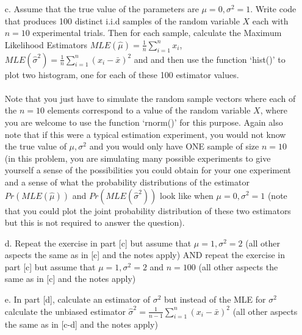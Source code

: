 \documentclass[letterpaper, 11pt]{article}
\begin{document}
\begin{itemize}

\item[c.] Assume that the true value of the parameters are $\mu=0, \sigma^2 = 1$.  Write code that produces 100 distinct i.i.d samples of the random variable $X$ each with $n=10$ experimental trials.  Then for each sample, calculate the Maximum Likelihood Estimators $MLE(\hat{\mu})=\frac{1}{n}\sum_{i=1}^{n} x_i$, $MLE(\hat{\sigma}^2)=\frac{1}{n}\sum_{i=1}^{n} (x_i - \bar{x})^2$ and and then use the function `hist()' to plot two histogram, one for each of these 100 estimator values.\\
\\
Note that you just have to simulate the random sample vectors where each of the $n=10$ elements correspond to a value of the random variable $X$, where you are welcome to use the function `rnorm()' for this purpose.  Again also note that if this were a typical estimation experiment, you would not know the true value of $\mu,\sigma^2$ and you would only have ONE sample of size $n=10$ (in this problem, you are simulating many possible experiments to give yourself a sense of the possibilities you could obtain for your one experiment and a sense of what the probability distributions of the estimator $Pr(MLE(\hat{\mu}))$ and $Pr(MLE(\hat{\sigma}^2))$ look like when $\mu=0, \sigma^2 = 1$ (note that you could plot the joint probability distribution of these two estimators but this is not required to answer the question).

\item[d.] Repeat the exercise in part [c] but assume that $\mu=1, \sigma^2 = 2$ (all other aspects the same as in [c] and the notes apply) AND repeat the exercise in part [c] but assume that $\mu=1, \sigma^2 = 2$ and $n=100$ (all other aspects the same as in [c] and the notes apply)\\

\item[e.] In part [d], calculate an estimator of $\sigma^2$ but instead of the MLE for $\sigma^2$ calculate the unbiased estimator $\hat{\sigma}^2 = \frac{1}{n-1} \sum_{i=1}^{n} (x_i - \bar{x})^2$ (all other aspects the same as in [c-d] and the notes apply)\\

\end{itemize}
\end{document}
